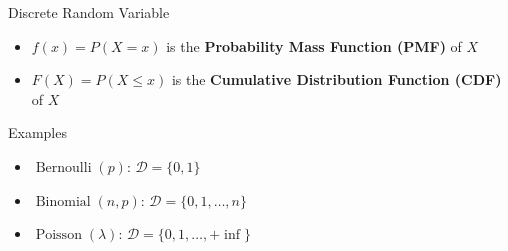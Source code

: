 \documentclass{beamer}\usepackage[]{graphicx}\usepackage[]{color}
\begin{document}
\begin{frame}{Discrete Random Variable}
  \begin{itemize}
    \item $f(x) = P(X=x)$ is the \textbf{Probability Mass Function (PMF)} of $X$
    \item $F(X) = P(X\le x)$ is the \textbf{Cumulative Distribution Function (CDF)} of $X$
  \end{itemize}
  \begin{exampleblock}{Examples}
    \begin{itemize}
      \item $\operatorname{Bernoulli}(p)$: $\mathcal{D} = \{0, 1\}$
      \item $\operatorname{Binomial}(n, p)$: $\mathcal{D} = \{0, 1, \dots, n\}$
      \item $\operatorname{Poisson}(\lambda)$: $\mathcal{D} = \{0, 1, \dots, +\inf\}$
    \end{itemize}
  \end{exampleblock}
\end{frame}
\end{document}
